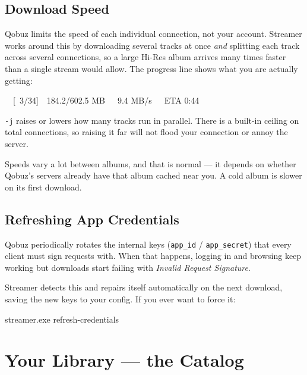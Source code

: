\documentclass[11pt,a4paper]{article}
\begin{document}
\subsection{Download Speed}

Qobuz limits the speed of each individual connection, not your account.
Streamer works around this by downloading several tracks at once \emph{and}
splitting each track across several connections, so a large Hi-Res album
arrives many times faster than a single stream would allow.  The progress line
shows what you are actually getting:

\begin{cmdbox}
~~[~3/34]~~184.2/602.5 MB~~~9.4 MB/s~~~ETA 0:44
\end{cmdbox}

\texttt{-j} raises or lowers how many tracks run in parallel.  There is a
built-in ceiling on total connections, so raising it far will not flood your
connection or annoy the server.

\begin{tipbox}
Speeds vary a lot between albums, and that is normal --- it depends on whether
Qobuz's servers already have that album cached near you.  A cold album is
slower on its first download.
\end{tipbox}

\subsection{Refreshing App Credentials}

Qobuz periodically rotates the internal keys (\texttt{app\_id} /
\texttt{app\_secret}) that every client must sign requests with.  When that
happens, logging in and browsing keep working but downloads start failing with
\emph{Invalid Request Signature}.

Streamer detects this and repairs itself automatically on the next download,
saving the new keys to your config.  If you ever want to force it:

\begin{cmdbox}
streamer.exe refresh-credentials
\end{cmdbox}

\section{Your Library --- the Catalog}
\end{document}
